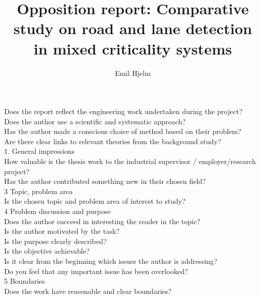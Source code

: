 \documentclass{article}
\title{Opposition report: Comparative study on road and lane detection in mixed criticality systems}
\author{Emil Hjelm}
\begin{document}
\maketitle

Does the report reflect the engineering work undertaken during the project?\\

Does the author use a scientific and systematic approach?\\

Has the author made a conscious choice of method based on their problem?\\

Are there clear links to relevant theories from the background study?\\

1. General impressions\\

How valuable is the thesis work to the industrial supervisor / employer/research project?\\

Has the author contributed something new in their chosen field?\\

3 Topic, problem area\\

Is the chosen topic and problem area of interest to study?\\

4 Problem discussion and purpose\\

Does the author succeed in interesting the reader in the topic?\\

Is the author motivated by the task?\\

Is the purpose clearly described?\\

Is the objective achievable?\\

Is it clear from the beginning which issues the author is addressing?\\

Do you feel that any important issue has been overlooked?\\

5 Boundaries\\

Does the work have reasonable and clear boundaries?\\
\end{document}
